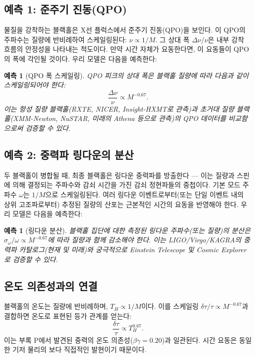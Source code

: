 \documentclass[12pt,a4paper]{article}
\newtheorem{prediction}[theorem]{예측}
\begin{document}
	\subsection{예측 1: 준주기 진동(QPO)}
	
	물질을 강착하는 블랙홀은 X선 플럭스에서 준주기 진동(QPO)을 보인다. 이 QPO의 주파수는 질량에 반비례하여 스케일링된다: \(\nu \propto 1/M\). 그 상대 폭 \(\Delta\nu/\nu\)은 내부 강착 흐름의 안정성을 나타내는 척도이다. 만약 시간 자체가 요동한다면, 이 요동들이 QPO의 폭에 각인될 것이다. 우리 모델은 다음을 예측한다:
	\begin{prediction}[QPO 폭 스케일링]
		QPO 피크의 상대 폭은 블랙홀 질량에 따라 다음과 같이 스케일링되어야 한다:
		\begin{equation}
			\frac{\Delta\nu}{\nu} \propto M^{-0.67}.
		\end{equation}
		이는 항성 질량 블랙홀(RXTE, NICER, Insight-HXMT로 관측)과 초거대 질량 블랙홀(XMM-Newton, NuSTAR, 미래의 Athena 등으로 관측)의 QPO 데이터를 비교함으로써 검증할 수 있다.
	\end{prediction}
	
	\subsection{예측 2: 중력파 링다운의 분산}
	
	두 블랙홀이 병합될 때, 최종 블랙홀은 링다운 중력파를 방출한다 — 이는 질량과 스핀에 의해 결정되는 주파수와 감쇠 시간을 가진 감쇠 정현파들의 중첩이다. 기본 모드 주파수 \(\omega\)는 \(1/M\)으로 스케일링된다. 여러 링다운 이벤트로부터(또는 단일 이벤트 내의 상위 고조파로부터) 추정된 질량의 산포는 근본적인 시간의 요동을 반영해야 한다. 우리 모델은 다음을 예측한다:
	\begin{prediction}[링다운 분산]
		블랙홀 집단에 대한 측정된 링다운 주파수(또는 질량)의 분산은 \(\sigma_{\omega}/\omega \propto M^{-0.67}\)에 따라 질량과 함께 감소해야 한다. 이는 LIGO/Virgo/KAGRA의 중력파 카탈로그(현재 및 미래)와 궁극적으로 Einstein Telescope 및 Cosmic Explorer로 검증할 수 있다.
	\end{prediction}
	
	\subsection{온도 의존성과의 연결}
	
	블랙홀의 온도는 질량에 반비례하며, \(T_H \propto 1/M\)이다. 이를 스케일링 \(\delta\tau/\tau \propto M^{-0.67}\)과 결합하면 온도로 표현된 등가 관계를 얻는다:
	\begin{equation}
		\frac{\delta\tau}{\tau} \propto T_H^{0.67}.
	\end{equation}
	이는 부록 P에서 발견된 중력의 온도 의존성(\(\beta\gamma = 0.20\))과 일관된다. 시간 요동은 동일한 기저 물리의 보다 직접적인 발현이기 때문이다.
	
\end{document}
